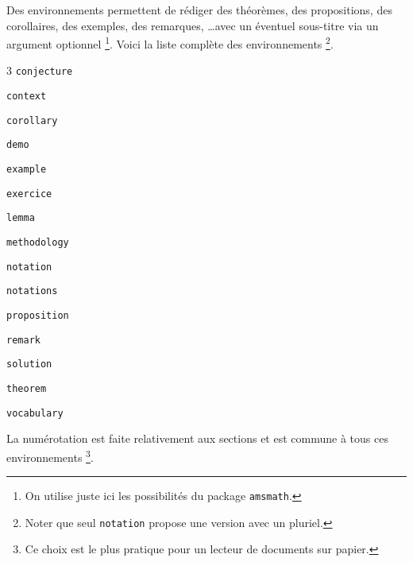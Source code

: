 Des environnements permettent de rédiger des théorèmes, des propositions, des corollaires, des exemples, des remarques, \dots avec un éventuel sous-titre via un argument optionnel
\footnote{
	On utilise juste ici les possibilités du package \texttt{amsmath}.
}. Voici la liste complète des environnements
\footnote{
	Noter que seul \texttt{notation} propose une version avec un pluriel.
}.

\begin{multicols-sep}{3}
	\verb+conjecture+

	\verb+context+

	\verb+corollary+

	\verb+demo+

	\verb+example+

	\verb+exercice+
	
	\verb+lemma+

	\verb+methodology+

	\verb+notation+
	
	\verb+notations+

	\verb+proposition+

	\verb+remark+

	\verb+solution+

	\verb+theorem+

	\verb+vocabulary+
	
\end{multicols-sep}


\medskip


La numérotation est faite relativement aux sections et est commune à tous ces environnements
\footnote{
	Ce choix est le plus pratique pour un lecteur de documents sur papier.
}.
